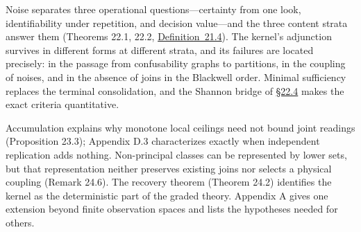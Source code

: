 
Noise separates three operational questions---\hspace{0pt}certainty from one look, identifiability under repetition, and decision value---\hspace{0pt}and the three content strata answer them (Theorems 22.1, 22.2, \hyperlink{stmt:21.4}{Definition~21.4}). The kernel's adjunction survives in different forms at different strata, and its failures are located precisely: in the passage from confusability graphs to partitions, in the coupling of noises, and in the absence of joins in the Blackwell order. Minimal sufficiency replaces the terminal consolidation, and the Shannon bridge of \hyperlink{sec:22.4}{§22.4} makes the exact criteria quantitative.

Accumulation explains why monotone local ceilings need not bound joint readings (Proposition 23.3); Appendix D.3 characterizes exactly when independent replication adds nothing. Non-principal classes can be represented by lower sets, but that representation neither preserves existing joins nor selects a physical coupling (Remark 24.6). The recovery theorem (Theorem 24.2) identifies the kernel as the deterministic part of the graded theory. Appendix A gives one extension beyond finite observation spaces and lists the hypotheses needed for others.
